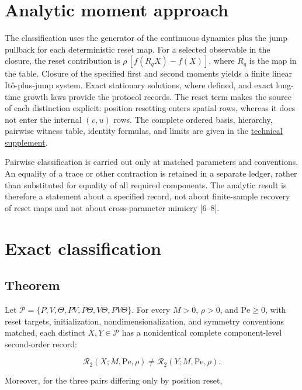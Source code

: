 \section{Analytic moment approach}\label{analytic-moment-approach}

The classification uses the generator of the continuous dynamics plus the jump pullback for each deterministic reset map. For a selected observable in the closure, the reset contribution is \(\rho\,[f(R_qX)-f(X)]\), where \(R_q\) is the map in the table. Closure of the specified first and second moments yields a finite linear Itô-plus-jump system. Exact stationary solutions, where defined, and exact long-time growth laws provide the protocol records. The reset term makes the source of each distinction explicit: position resetting enters spatial rows, whereas it does not enter the internal \((v,u)\) rows. The complete ordered basis, hierarchy, pairwise witness table, identity formulas, and limits are given in the \href{PHASEMAP_TECHNICAL_SUPPLEMENT.pdf}{technical supplement}.

Pairwise classification is carried out only at matched parameters and conventions. An equality of a trace or other contraction is retained in a separate ledger, rather than substituted for equality of all required components. The analytic result is therefore a statement about a specified record, not about finite-sample recovery of reset maps and not about cross-parameter mimicry {[}6--8{]}.

\section{Exact classification}\label{exact-classification}

\subsection{Theorem}\label{theorem}

Let \(\mathcal P=\{P,V,\Theta,PV,P\Theta,V\Theta,PV\Theta\}\). For every \(M>0\), \(\rho>0\), and \(\mathrm{Pe}\ge0\), with reset targets, initialization, nondimensionalization, and symmetry conventions matched, each distinct \(X,Y\in\mathcal P\) has a nonidentical complete component-level second-order record:

\[
\mathcal R_2(X;M,\mathrm{Pe},\rho)\ne
\mathcal R_2(Y;M,\mathrm{Pe},\rho).
\]

Moreover, for the three pairs differing only by position reset,

